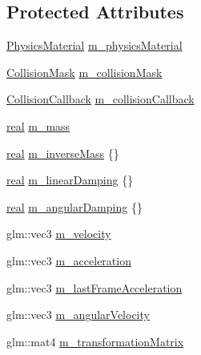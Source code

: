 \subsection*{Protected Attributes}
\begin{DoxyCompactItemize}
\item 
\mbox{\hyperlink{classr3_1_1_physics_material}{Physics\+Material}} \mbox{\hyperlink{classr3_1_1_rigid_body_abcd4f744963b80cc1d592ccec117fd54}{m\+\_\+physics\+Material}}
\item 
\mbox{\hyperlink{structr3_1_1_collision_mask}{Collision\+Mask}} \mbox{\hyperlink{classr3_1_1_rigid_body_a9ce3f6c2a0f158d9df5910c3697ebf7f}{m\+\_\+collision\+Mask}}
\item 
\mbox{\hyperlink{classr3_1_1_collision_callback}{Collision\+Callback}} \mbox{\hyperlink{classr3_1_1_rigid_body_a88185161bb32b108719e78a3944d5257}{m\+\_\+collision\+Callback}}
\item 
\mbox{\hyperlink{namespacer3_ab2016b3e3f743fb735afce242f0dc1eb}{real}} \mbox{\hyperlink{classr3_1_1_rigid_body_a9ecbd510187cfaaee3154d11f3bd782b}{m\+\_\+mass}}
\item 
\mbox{\hyperlink{namespacer3_ab2016b3e3f743fb735afce242f0dc1eb}{real}} \mbox{\hyperlink{classr3_1_1_rigid_body_a57f0423607e2ce9738a2fa796a443e5f}{m\+\_\+inverse\+Mass}} \{\}
\item 
\mbox{\hyperlink{namespacer3_ab2016b3e3f743fb735afce242f0dc1eb}{real}} \mbox{\hyperlink{classr3_1_1_rigid_body_aa7ae14fd779acb22a7c50aab88d1cb75}{m\+\_\+linear\+Damping}} \{\}
\item 
\mbox{\hyperlink{namespacer3_ab2016b3e3f743fb735afce242f0dc1eb}{real}} \mbox{\hyperlink{classr3_1_1_rigid_body_a3d9cfac391d02a657401f5e633361fe9}{m\+\_\+angular\+Damping}} \{\}
\item 
glm\+::vec3 \mbox{\hyperlink{classr3_1_1_rigid_body_a2de7cddcf262009fc8261688d1e56c49}{m\+\_\+velocity}}
\item 
glm\+::vec3 \mbox{\hyperlink{classr3_1_1_rigid_body_a3be64b2b09846d33ccdd9e276db020b9}{m\+\_\+acceleration}}
\item 
glm\+::vec3 \mbox{\hyperlink{classr3_1_1_rigid_body_aafe21461c488f0dffbbb2bd0c32f4585}{m\+\_\+last\+Frame\+Acceleration}}
\item 
glm\+::vec3 \mbox{\hyperlink{classr3_1_1_rigid_body_a2dd81db6f395b19d9bff314f198eedb8}{m\+\_\+angular\+Velocity}}
\item 
glm\+::mat4 \mbox{\hyperlink{classr3_1_1_rigid_body_ab973e24d84aedb3188aa04fcd2817228}{m\+\_\+transformation\+Matrix}}
\item 

\end{DoxyCompactItemize}
